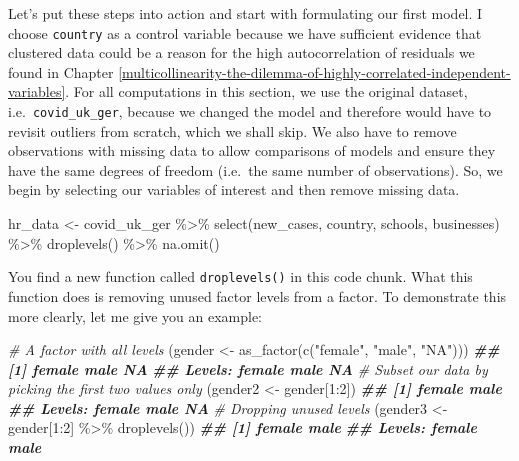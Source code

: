 \documentclass[
]{book}
\newenvironment{Shaded}{\begin{snugshade}}{\end{snugshade}}
\newcommand{\CommentTok}[1]{\textcolor[rgb]{0.56,0.35,0.01}{\textit{#1}}}
\newcommand{\DecValTok}[1]{\textcolor[rgb]{0.00,0.00,0.81}{#1}}
\newcommand{\DocumentationTok}[1]{\textcolor[rgb]{0.56,0.35,0.01}{\textbf{\textit{#1}}}}
\newcommand{\FunctionTok}[1]{\textcolor[rgb]{0.00,0.00,0.00}{#1}}
\newcommand{\NormalTok}[1]{#1}
\newcommand{\OtherTok}[1]{\textcolor[rgb]{0.56,0.35,0.01}{#1}}
\newcommand{\SpecialCharTok}[1]{\textcolor[rgb]{0.00,0.00,0.00}{#1}}
\newcommand{\StringTok}[1]{\textcolor[rgb]{0.31,0.60,0.02}{#1}}
\begin{document}
Let's put these steps into action and start with formulating our first model. I choose \texttt{country} as a control variable because we have sufficient evidence that clustered data could be a reason for the high autocorrelation of residuals we found in Chapter \ref{multicollinearity-the-dilemma-of-highly-correlated-independent-variables}. For all computations in this section, we use the original dataset, i.e.~\texttt{covid\_uk\_ger}, because we changed the model and therefore would have to revisit outliers from scratch, which we shall skip. We also have to remove observations with missing data to allow comparisons of models and ensure they have the same degrees of freedom (i.e.~the same number of observations). So, we begin by selecting our variables of interest and then remove missing data.

\begin{Shaded}
\begin{Highlighting}[]
\NormalTok{hr\_data }\OtherTok{\textless{}{-}}\NormalTok{ covid\_uk\_ger }\SpecialCharTok{\%\textgreater{}\%}
  \FunctionTok{select}\NormalTok{(new\_cases, country, schools, businesses) }\SpecialCharTok{\%\textgreater{}\%}
  \FunctionTok{droplevels}\NormalTok{() }\SpecialCharTok{\%\textgreater{}\%}
  \FunctionTok{na.omit}\NormalTok{()}
\end{Highlighting}
\end{Shaded}

You find a new function called \texttt{droplevels()} in this code chunk. What this function does is removing unused factor levels from a factor. To demonstrate this more clearly, let me give you an example:

\begin{Shaded}
\begin{Highlighting}[]
\CommentTok{\# A factor with all levels}
\NormalTok{(gender }\OtherTok{\textless{}{-}} \FunctionTok{as\_factor}\NormalTok{(}\FunctionTok{c}\NormalTok{(}\StringTok{"female"}\NormalTok{, }\StringTok{"male"}\NormalTok{, }\StringTok{"NA"}\NormalTok{)))}
\DocumentationTok{\#\# [1] female male   NA    }
\DocumentationTok{\#\# Levels: female male NA}
\CommentTok{\# Subset our data by picking the first two values only}
\NormalTok{(gender2 }\OtherTok{\textless{}{-}}\NormalTok{ gender[}\DecValTok{1}\SpecialCharTok{:}\DecValTok{2}\NormalTok{])}
\DocumentationTok{\#\# [1] female male  }
\DocumentationTok{\#\# Levels: female male NA}
\CommentTok{\# Dropping unused levels}
\NormalTok{(gender3 }\OtherTok{\textless{}{-}}\NormalTok{ gender[}\DecValTok{1}\SpecialCharTok{:}\DecValTok{2}\NormalTok{] }\SpecialCharTok{\%\textgreater{}\%} \FunctionTok{droplevels}\NormalTok{())}
\DocumentationTok{\#\# [1] female male  }
\DocumentationTok{\#\# Levels: female male}
\end{Highlighting}
\end{Shaded}
\end{document}
